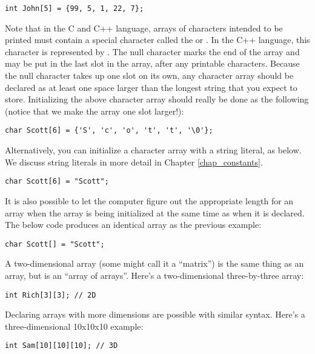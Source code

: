 \begin{lstlisting}
int John[5] = {99, 5, 1, 22, 7};
\end{lstlisting}
	
Note that in the C and C++ language, arrays of characters intended to be printed must contain a special character called the  or . 
In the C++ language, this character is represented by . 
The null character marks the end of the array and may be put in the last slot in the array, after any printable characters. 
Because the null character takes up one slot on its own, any character array should be declared as at least one space larger than the longest string that you expect to store. 
Initializing the above character array should really be done as the following (notice that we make the array one slot larger!):

\begin{lstlisting}
char Scott[6] = {'S', 'c', 'o', 't', 't', '\0'};	
\end{lstlisting}

Alternatively, you can initialize a character array with a string literal, as below. 
We discuss string literals in more detail in Chapter \ref{chap_constants}.

\begin{lstlisting}
char Scott[6] = "Scott";	
\end{lstlisting}

It is also possible to let the computer figure out the appropriate length for an array when the array is being initialized at the same time as when it is declared. 
The below code produces an identical array as the previous example:

\begin{lstlisting}
char Scott[] = "Scott";	
\end{lstlisting}


A two-dimensional array (some might call it a ``matrix'') is the same thing as an array, but is an ``array of arrays''.
Here's a two-dimensional three-by-three array:

\begin{lstlisting}
int Rich[3][3]; // 2D
\end{lstlisting}

Declaring arrays with more dimensions are possible with similar syntax. 
Here's a three-dimensional 10x10x10 example:

\begin{lstlisting}
int Sam[10][10][10]; // 3D
\end{lstlisting}

